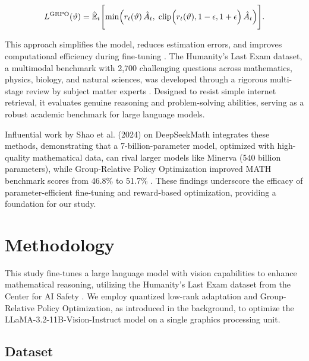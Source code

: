 \documentclass{svproc}
\begin{document}
\begin{equation}
  L^{\text{GRPO}}(\vartheta) = \hat{\mathbb{E}}_t \Biggl[ \min\Bigl( r_t(\vartheta)\, \hat{A}_t,\; \text{clip}\Bigl(r_t(\vartheta), 1-\epsilon, 1+\epsilon\Bigr)\, \hat{A}_t \Bigr) \Biggr].
\end{equation}

This approach simplifies the model, reduces estimation errors, and improves computational efficiency during fine-tuning \cite{shao2024deepseekmathpushinglimitsmathematical}. The Humanity's Last Exam dataset, a multimodal benchmark with 2,700 challenging questions across mathematics, physics, biology, and natural sciences, was developed through a rigorous multi-stage review by subject matter experts \cite{phan2025humanitysexam}. Designed to resist simple internet retrieval, it evaluates genuine reasoning and problem-solving abilities, serving as a robust academic benchmark for large language models.

Influential work by Shao et al. (2024) on DeepSeekMath integrates these methods, demonstrating that a 7-billion-parameter model, optimized with high-quality mathematical data, can rival larger models like Minerva (540 billion parameters), while Group-Relative Policy Optimization improved MATH benchmark scores from 46.8\% to 51.7\% \cite{shao2024deepseekmathpushinglimitsmathematical}. These findings underscore the efficacy of parameter-efficient fine-tuning and reward-based optimization, providing a foundation for our study.


\section{Methodology}

This study fine-tunes a large language model with vision capabilities to enhance mathematical reasoning, utilizing the Humanity's Last Exam dataset from the Center for AI Safety \cite{phan2025humanitysexam}. We employ quantized low-rank adaptation and Group-Relative Policy Optimization, as introduced in the background, to optimize the LLaMA-3.2-11B-Vision-Instruct model on a single graphics processing unit.

\subsection{Dataset}
\end{document}
